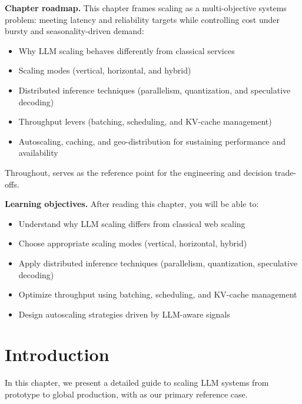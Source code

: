 \begin{tcolorbox}[
  title={\textbf{Chapter Overview}},
  colback=blue!5,
  colframe=blue!40!black,
  colbacktitle=blue!20,
  coltitle=black,
  fonttitle=\bfseries,
  boxrule=0.7pt,
  arc=4pt,
  left=5mm, right=5mm, top=4mm, bottom=4mm
]
\noindent\textbf{Chapter roadmap.}
This chapter frames scaling as a multi-objective systems problem: meeting latency and reliability targets while controlling cost under bursty and seasonality-driven demand:
\begin{itemize}[leftmargin=1.5em, itemsep=3pt]
    \item Why LLM scaling behaves differently from classical services
    \item Scaling modes (vertical, horizontal, and hybrid)
    \item Distributed inference techniques (parallelism, quantization, and speculative decoding)
    \item Throughput levers (batching, scheduling, and KV-cache management)
    \item Autoscaling, caching, and geo-distribution for sustaining performance and availability
\end{itemize}
Throughout, \ishtar{} serves as the reference point for the engineering and decision trade-offs.

\medskip
\noindent\textbf{Learning objectives.} After reading this chapter, you will be able to:
\begin{itemize}[leftmargin=1.5em, itemsep=3pt]
    \item Understand why LLM scaling differs from classical web scaling
    \item Choose appropriate scaling modes (vertical, horizontal, hybrid)
    \item Apply distributed inference techniques (parallelism, quantization, speculative decoding)
    \item Optimize throughput using batching, scheduling, and KV-cache management
    \item Design autoscaling strategies driven by LLM-aware signals
\end{itemize}
\end{tcolorbox}


\section{Introduction}
\label{sec:ch6-introduction}

In this chapter, we present a detailed guide to scaling LLM systems from prototype to global production, with \ishtar{} as our primary reference case.

